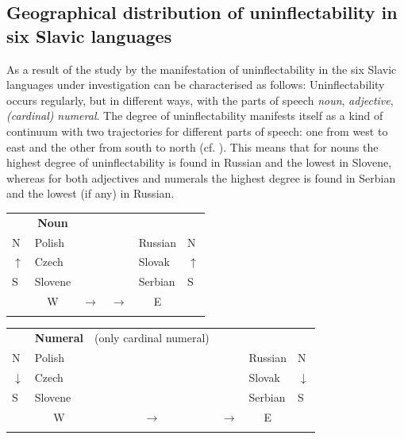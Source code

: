 \documentclass[output=paper]{langscibook}
\begin{document}
\subsection{Geographical distribution of uninflectability in six Slavic languages} %

As a result of the study by \citet{Doleschal2000} the manifestation of uninflectability in the six Slavic languages under investigation can be characterised as follows: Uninflectability occurs regularly, but in different ways, with the parts of speech \textit{noun}, \textit{adjective}, \textit{(cardinal)} \textit{numeral}. The degree of uninflectability manifests itself as a kind of continuum with two trajectories for different parts of speech: one from west to east and the other from south to north (cf. ). This means that for nouns the highest degree of uninflectability is found in Russian and the lowest in Slovene, whereas for both adjectives and numerals the highest degree is found in Serbian and the lowest (if any) in Russian.


\begin{tabularx}{\textwidth}{XXXXXX}

\lsptoprule
\multicolumn{1}{c}{} & \multicolumn{1}{c}{\textbf{Noun}} & \multicolumn{1}{c}{} & \multicolumn{1}{c}{} & \multicolumn{1}{c}{} & \\
N & Polish &  &  & Russian & N\\
${\uparrow}$ & Czech &  &  & Slovak & ${\uparrow}$\\
S & Slovene &  &  & Serbian & S\\
\multicolumn{1}{c}{} & \multicolumn{1}{c}{W} & \multicolumn{1}{c}{${\rightarrow}$} & \multicolumn{1}{c}{\raggedleft ${\rightarrow}$} & \multicolumn{1}{c}{\raggedleft E} & \\
\lspbottomrule
\end{tabularx}

\begin{tabularx}{\textwidth}{XXXXXX}

\lsptoprule
\multicolumn{1}{c}{} & \multicolumn{1}{c}{\textbf{Numeral}} & \multicolumn{1}{c}{(only cardinal numeral)} & \multicolumn{1}{c}{} & \multicolumn{1}{c}{} & \\
N & Polish &  &  & Russian & N\\
${\downarrow}$ & Czech &  &  & Slovak & ${\downarrow}$\\
S & Slovene &  &  & Serbian & S\\
\multicolumn{1}{c}{} & \multicolumn{1}{c}{W} & \multicolumn{1}{c}{${\rightarrow}$} & \multicolumn{1}{c}{\raggedleft ${\rightarrow}$} & \multicolumn{1}{c}{\raggedleft E} & \\
\lspbottomrule
\end{tabularx}
\end{document}
